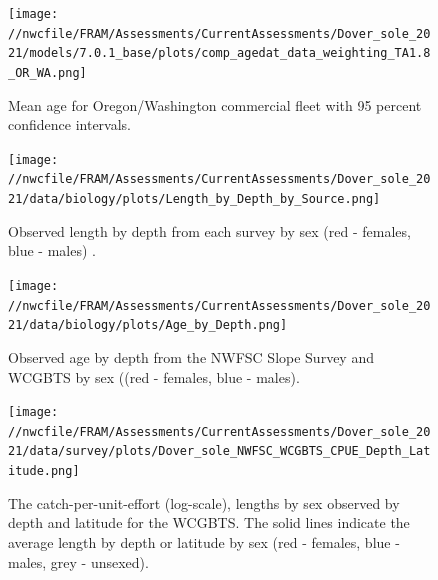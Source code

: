 \documentclass[11pt,
  english,
  a4paper,
]{article}
\begin{document}

\begin{figure}
\centering
\texttt{[image: //nwcfile/FRAM/Assessments/CurrentAssessments/Dover\_sole\_2021/models/7.0.1\_base/plots/comp\_agedat\_data\_weighting\_TA1.8\_OR\_WA.png]}
\caption{Mean age for Oregon/Washington commercial fleet with 95 percent confidence intervals.\label{fig:mean-orwa-age-data}}
\end{figure}

\tagmcend\tagstructend


\begin{figure}
\centering
\texttt{[image: //nwcfile/FRAM/Assessments/CurrentAssessments/Dover\_sole\_2021/data/biology/plots/Length\_by\_Depth\_by\_Source.png]}
\caption{Observed length by depth from each survey by sex (red - females, blue - males) .\label{fig:data-len-depth}}
\end{figure}

\tagmcend\tagstructend

\newpage


\begin{figure}
\centering
\texttt{[image: //nwcfile/FRAM/Assessments/CurrentAssessments/Dover\_sole\_2021/data/biology/plots/Age\_by\_Depth.png]}
\caption{Observed age by depth from the NWFSC Slope Survey and WCGBTS by sex ((red - females, blue - males).\label{fig:data-age-depth}}
\end{figure}

\tagmcend\tagstructend

\newpage


\begin{figure}
\centering
\texttt{[image: //nwcfile/FRAM/Assessments/CurrentAssessments/Dover\_sole\_2021/data/survey/plots/Dover\_sole\_NWFSC\_WCGBTS\_CPUE\_Depth\_Latitude.png]}
\caption{The catch-per-unit-effort (log-scale), lengths by sex observed by depth and latitude for the WCGBTS. The solid lines indicate the average length by depth or latitude by sex (red - females, blue - males, grey - unsexed).\label{fig:cpue-len}}
\end{figure}
\end{document}
